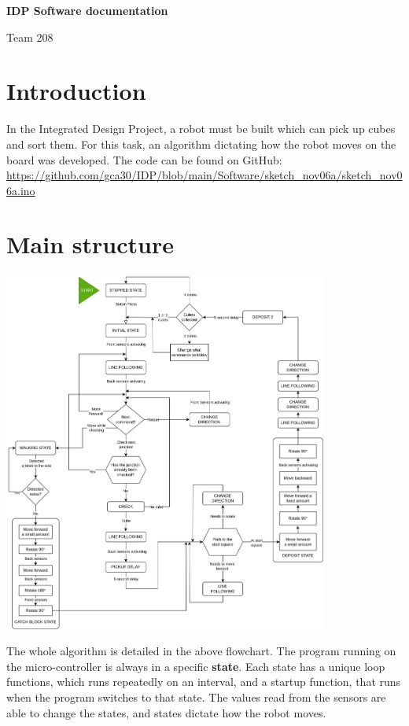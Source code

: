 \documentclass[11pt,a4paper,twoside]{article}
\begin{document}
\begin{center}
    \Large{\textbf{IDP Software documentation}}

    \Large{Team 208}
\end{center}
\vspace{0.05cm}

\section{Introduction}

In the Integrated Design Project, a robot must be built which can pick up cubes and sort them. For this task,
an algorithm dictating how the robot moves on the board was developed. 
The code can be found on GitHub: \url{https://github.com/gca30/IDP/blob/main/Software/sketch_nov06a/sketch_nov06a.ino}


\section{Main structure}

\begin{center}
    \includegraphics[width=0.8\textwidth]{flowchart}
\end{center}

The whole algorithm is detailed in the above flowchart. The program running on the micro-controller
is always in a specific \textbf{state}. Each state has a unique loop functions, which
runs repeatedly on an interval, and a startup function, that runs when the program switches to that state.
The values read from the sensors are able to change the states, and
states dictate how the robot moves.
\end{document}
